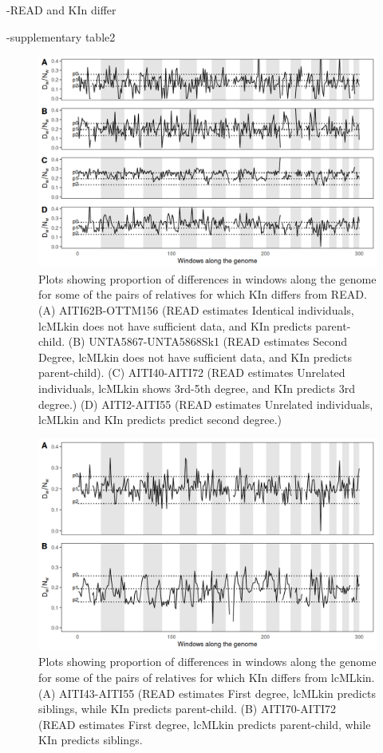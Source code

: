 \documentclass[12pt, letterpaper]{article}
\begin{document}
-READ and KIn differ

-supplementary table2
\begin{figure}[h]
    \centering
    \includegraphics[width=18cm]{supplementary_info/plots/egplot1.png}
    \caption{Plots showing proportion of differences in windows along the genome for some of the pairs of relatives for which KIn differs from READ. (A) AITI62B-OTTM156 (READ estimates Identical individuals, lcMLkin does not have sufficient data, and KIn predicts parent-child. (B) UNTA5867-UNTA5868Sk1 (READ estimates Second Degree, lcMLkin does not have sufficient data, and KIn predicts parent-child). (C) AITI40-AITI72 (READ estimates Unrelated individuals, lcMLkin shows 3rd-5th degree, and KIn predicts 3rd degree.)
    (D) AITI2-AITI55 (READ estimates Unrelated individuals, lcMLkin and KIn predicts predict second degree.)}
    \label{figS5}
\end{figure}

\begin{figure}[h]
    \centering
    \includegraphics[width=18cm]{supplementary_info/plots/egplot2.png}
    \caption{Plots showing proportion of differences in windows along the genome for some of the pairs of relatives for which KIn differs from lcMLkin. (A) AITI43-AITI55 (READ estimates First degree, lcMLkin predicts siblings, while KIn predicts parent-child. (B) AITI70-AITI72 (READ estimates First degree, lcMLkin predicts parent-child, while KIn predicts siblings.}
    \label{figS5}
\end{figure}
\end{document}
